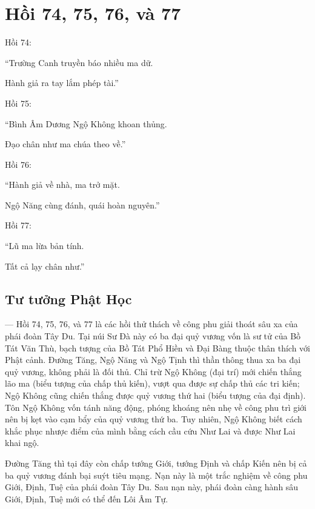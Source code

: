 \chapter{Hồi 74, 75, 76, và 77} %
\label{cha:hoi_74_75}

Hồi 74:

\begin{itshape}
``Trường Canh truyền báo nhiều ma dữ.

Hành giả ra tay lắm phép tài.''
\end{itshape}

Hồi 75:

\begin{itshape}
``Bình Âm Dương Ngộ Không khoan thủng.

Đạo chân như ma chúa theo về.''
\end{itshape}

Hồi 76:

\begin{itshape}
``Hành giả về nhà, ma trở mặt.

Ngộ Năng cùng đánh, quái hoàn nguyên.''
\end{itshape}

Hồi 77:

\begin{itshape}
``Lũ ma lừa bản tính.

Tất cả lạy chân như.''
\end{itshape}

\section{Tư tưởng Phật Học} %
\label{sec:74_75_phat_hoc}

--- Hồi 74, 75, 76, và 77 là các hồi thử thách về công phu giải thoát sâu xa của phái đoàn Tây Du. Tại núi Sư Đà này có ba đại quỷ vương vốn là sư tử của Bồ Tát Văn Thù, bạch tượng của Bồ Tát Phổ Hiền và Đại Bàng thuộc thân thích với Phật cảnh. Đường Tăng, Ngộ Năng và Ngộ Tịnh thì thần thông thua xa ba đại quỷ vương, không phải là đối thủ. Chỉ trừ Ngộ Không (đại trí) mới chiến thắng lão ma (biểu tượng của chấp thủ kiến), vượt qua được sự chấp thủ các tri kiến; Ngộ Không cũng chiến thắng được quỷ vương thứ hai (biểu tượng của đại định). Tôn Ngộ Không vốn tánh năng động, phóng khoáng nên nhẹ về công phu trì giới nên bị kẹt vào cạm bẩy của quỷ vương thứ ba. Tuy nhiên, Ngộ Không biết cách khắc phục nhược điểm của mình bằng cách cầu cứu Như Lai và được Như Lai khai ngộ.

Đường Tăng thì tại đây còn chấp tướng Giới, tướng Định và chấp Kiến nên bị cả ba quỷ vương đánh bại suýt tiêu mạng. Nạn này là một trắc nghiệm về công phu Giới, Định, Tuệ của phái đoàn Tây Du. Sau nạn này, phái đoàn càng hành sâu Giới, Định, Tuệ mới có thể đến Lôi Âm Tự.

